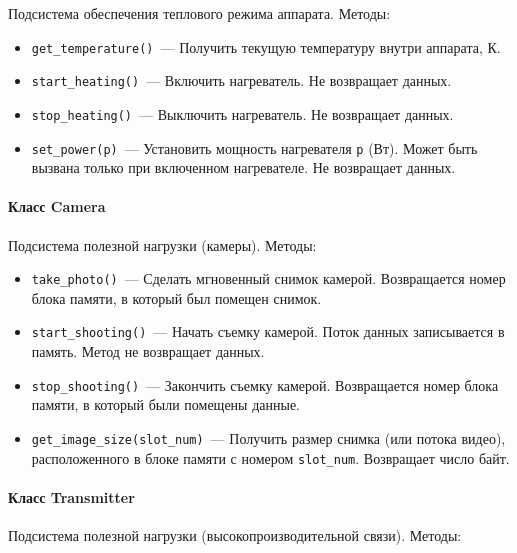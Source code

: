 \documentclass[12pt,a4paper]{article}
\begin{document}
Подсистема обеспечения теплового режима аппарата. Методы:

\begin{itemize}
\item \verb'get_temperature()'~--- Получить текущую температуру внутри аппарата, К.
\item \verb'start_heating()'~--- Включить нагреватель. Не возвращает данных.
\item \verb'stop_heating()'~--- Выключить нагреватель. Не возвращает данных.
\item \verb'set_power(p)'~--- Установить мощность нагревателя \verb'p' (Вт). Может быть
  вызвана только при включенном нагревателе. Не возвращает данных.
\end{itemize}

\paragraph{Класс Camera}

Подсистема полезной нагрузки (камеры). Методы:

\begin{itemize}
\item \verb'take_photo()'~--- Сделать мгновенный снимок камерой. Возвращается номер блока
  памяти, в который был помещен снимок.
\item \verb'start_shooting()'~--- Начать съемку камерой. Поток данных записывается в
  память. Метод не возвращает данных.
\item \verb'stop_shooting()'~--- Закончить съемку камерой. Возвращается номер блока
  памяти, в который были помещены данные.
\item \verb'get_image_size(slot_num)'~--- Получить размер снимка (или потока видео),
  расположенного в блоке памяти с номером \verb'slot_num'. Возвращает число байт.
\end{itemize}

\paragraph{Класс Transmitter}

Подсистема полезной нагрузки (высокопроизводительной связи). Методы:
\end{document}
